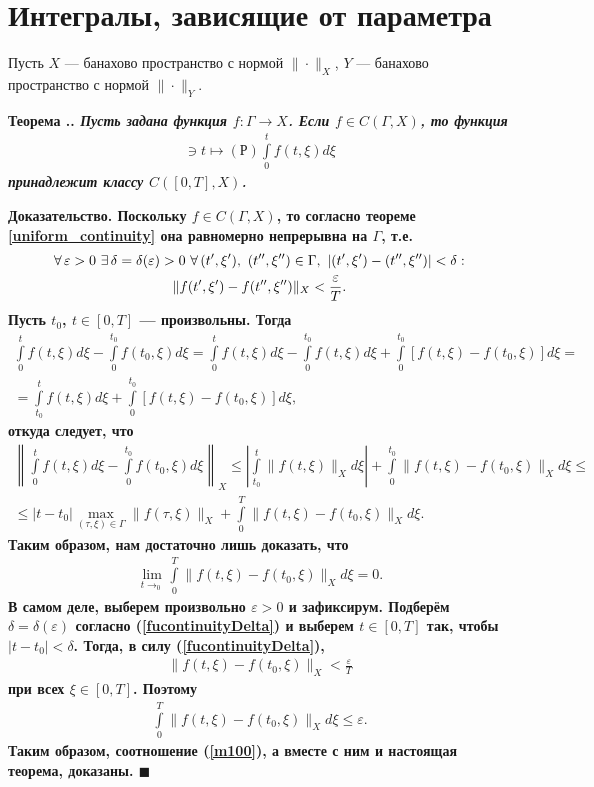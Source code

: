 \documentclass{report}
\newcounter{rem}[section]
\newcounter{theor}[section]
\renewcommand{\thetheor}{\thesection.\arabic{theor}}
\newenvironment{Theorem}{\par\refstepcounter{theor}\bf Теорема \thetheor. \it}{\rm\par}
\newenvironment{Proof}{\par\noindent\bf Доказательство.\rm}{ $\blacksquare$\par}
\begin{document}
        \section{Интегралы, зависящие от параметра}
Пусть $X$ --- банахово пространство с нормой $\|\cdot\|_X$, $Y$ --- банахово пространство с нормой $\|\cdot\|_Y$.
\begin{Theorem}\label{parametric_integral_0}
Пусть задана функция $f\colon\Gamma\to X$. Если $f\in C(\Gamma,X)$, то функция
\begin{gather*}
[0,T]\ni t\mapsto(\textrm{Р})\int\limits_0^tf(t,\xi)d\xi
\end{gather*}
принадлежит классу $C([0,T],X)$.
\end{Theorem}
\begin{Proof}
Поскольку $f\in C(\Gamma,X)$, то согласно теореме \ref{uniform_continuity} она равномерно непрерывна на $\Gamma$, т.е.
\begin{gather}\label{fucontinuityDelta}
\forall\,\varepsilon>0\,\,\exists\,\delta=\delta(\varepsilon)>0\,\,\forall\,(t',\xi'),\,\,(t'',\xi'')\in\Gamma,\,\,|(t',\xi')-(t'',\xi'')|<\delta:\\
\notag\|f(t',\xi')-f(t'',\xi'')\|_X<\frac\varepsilon{T}.
\end{gather}
Пусть $t_0$, $t\in[0,T]$ --- произвольны. Тогда
\begin{gather*}
\int\limits_0^tf(t,\xi)d\xi-\int\limits_0^{t_0}f(t_0,\xi)d\xi=\int\limits_0^tf(t,\xi)d\xi-\int\limits_0^{t_0}f(t,\xi)d\xi+\int\limits_0^{t_0}[f(t,\xi)-f(t_0,\xi)]d\xi=\\
=\int\limits_{t_0}^tf(t,\xi)d\xi+\int\limits_0^{t_0}[f(t,\xi)-f(t_0,\xi)]d\xi,
\end{gather*}
откуда следует, что
\begin{gather*}
\left\|\int\limits_0^tf(t,\xi)d\xi-\int\limits_0^{t_0}f(t_0,\xi)d\xi\right\|_X\leqslant\left|\int\limits_{t_0}^t\|f(t,\xi)\|_Xd\xi\right|+\int\limits_0^{t_0}\|f(t,\xi)-f(t_0,\xi)\|_Xd\xi
\leqslant\\
\leqslant|t-t_0|\max\limits_{(\tau,\xi)\in\Gamma}\|f(\tau,\xi)\|_X+ \int\limits_0^{T}\|f(t,\xi)-f(t_0,\xi)\|_Xd\xi.
\end{gather*}
Таким образом, нам достаточно лишь доказать, что
\begin{gather}\label{m100}
\lim\limits_{t\to_0}\int\limits_0^{T}\|f(t,\xi)-f(t_0,\xi)\|_Xd\xi=0.
\end{gather}
В самом деле, выберем произвольно $\varepsilon>0$ и зафиксирум. Подберём $\delta=\delta(\varepsilon)$ согласно (\ref{fucontinuityDelta}) и
выберем $t\in[0,T]$ так, чтобы $|t-t_0|<\delta$. Тогда, в силу (\ref{fucontinuityDelta}),
\begin{gather*}
\|f(t,\xi)-f(t_0,\xi)\|_X<\frac\varepsilon T
\end{gather*}
при всех $\xi\in[0,T]$. Поэтому
\begin{gather*}
\int\limits_0^{T}\|f(t,\xi)-f(t_0,\xi)\|_Xd\xi\leqslant\varepsilon.
\end{gather*}
Таким образом, соотношение (\ref{m100}), а вместе с ним и настоящая теорема, доказаны.
\end{Proof}
\end{document}
